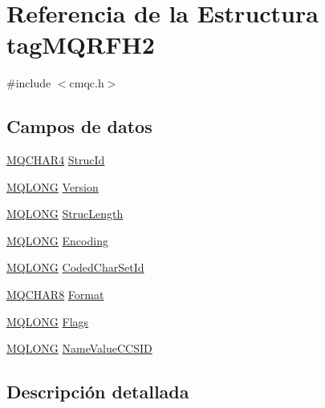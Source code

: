 \hypertarget{structtag_m_q_r_f_h2}{}\section{Referencia de la Estructura tag\+M\+Q\+R\+F\+H2}
\label{structtag_m_q_r_f_h2}


{\ttfamily \#include $<$cmqc.\+h$>$}

\subsection*{Campos de datos}
\begin{DoxyCompactItemize}
\item 
\hyperlink{cmqc_8h_a12590e546ed66fda7cf21c1d5cefa31d}{M\+Q\+C\+H\+A\+R4} \hyperlink{structtag_m_q_r_f_h2_a0530922ca944569b52601d74941f96e4}{Struc\+Id}
\item 
\hyperlink{cmqc_8h_a1fb8d28cbda3fa8766a9821230cdb6d5}{M\+Q\+L\+O\+N\+G} \hyperlink{structtag_m_q_r_f_h2_a0656ef8f766b3907d394d88a35d7b7e9}{Version}
\item 
\hyperlink{cmqc_8h_a1fb8d28cbda3fa8766a9821230cdb6d5}{M\+Q\+L\+O\+N\+G} \hyperlink{structtag_m_q_r_f_h2_a830af9a4a08c015b9a4b2d39d4d3420a}{Struc\+Length}
\item 
\hyperlink{cmqc_8h_a1fb8d28cbda3fa8766a9821230cdb6d5}{M\+Q\+L\+O\+N\+G} \hyperlink{structtag_m_q_r_f_h2_a30167bf454a49a60fd3fe4e9e586af34}{Encoding}
\item 
\hyperlink{cmqc_8h_a1fb8d28cbda3fa8766a9821230cdb6d5}{M\+Q\+L\+O\+N\+G} \hyperlink{structtag_m_q_r_f_h2_a4d8d1961a991850d1355cdf9b4680b8e}{Coded\+Char\+Set\+Id}
\item 
\hyperlink{cmqc_8h_abddcedb8c41fa262f2bd05dfec3e60a5}{M\+Q\+C\+H\+A\+R8} \hyperlink{structtag_m_q_r_f_h2_a435a478822008713f8aaff89f369ed63}{Format}
\item 
\hyperlink{cmqc_8h_a1fb8d28cbda3fa8766a9821230cdb6d5}{M\+Q\+L\+O\+N\+G} \hyperlink{structtag_m_q_r_f_h2_a8da770267273b200fa9c968fa2a0da57}{Flags}
\item 
\hyperlink{cmqc_8h_a1fb8d28cbda3fa8766a9821230cdb6d5}{M\+Q\+L\+O\+N\+G} \hyperlink{structtag_m_q_r_f_h2_a9efebd4dde2b30d7bda80cc35bb3864b}{Name\+Value\+C\+C\+S\+I\+D}
\end{DoxyCompactItemize}


\subsection{Descripción detallada}


